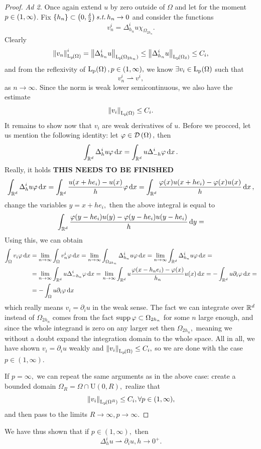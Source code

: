\documentclass{article}
\begin{document}
\begin{proof}
	\textit{Ad 2.}
	Once again extend $u$ by zero outside of $\Omega$ and let for the moment $p \in \qty(1,\infty)$. Fix $\qty{h_n} \subset \qty(0, \frac{\delta}{2}) \, \text{\textit{s.t.}} \, h_n \to 0$ and consider the functions
	\[
		v_n^i = \Delta_{h_n}^i u \chi_{\Omega_{2 h_n}}.
	\]
	Clearly
	\[
		\norm{v_n}^i_{\LpSet{\Omega}} = \norm{\Delta^i_{{h_n}} u}_{\LpSet{\Omega_{2 h_n}}} \leq \norm{\Delta^i_{{h_n}} u}_{\LpSet{\Omega_{\delta}}} \leq C_i,
	\]
	and from the reflexivity of $\LpSet{\Omega}, p \in \qty(1, \infty),$ we know $\exists v_i \in \LpSet{\Omega}$ such that
	\[
		v_n^i \rightharpoonup v^i,
	\]
	as $n \to \infty.$ Since the norm is weak lower semicontinuous, we also have the estimate
	\[
		\norm{v_i}_{\LpSet{\Omega}} \leq C_i.
	\]
	It remains to show now that $v_i$ are weak derivatives of $u$. Before we procced, let us mention the following identity: let $\varphi \in \mathcal{D}\!\,\left(\Omega \right),$ then
	\[
		\int_{{\mathbb R}^{d}}\Delta_h^i u \varphi\dd{x} = \int_{{\mathbb R}^{d}}u \Delta_{-h}^i \varphi\dd{x}.
	\]
	Really, it holds \textbf{THIS NEEDS TO BE FINISHED}
	\[
		\int_{{\mathbb R}^{d}}\Delta_h^i u \varphi\dd{x} = \int_{{\mathbb R}^{d}}\frac{u\qty(x+he_i) - u\qty(x)}{h}\varphi\dd{x} = \int_{{\mathbb R}^{d}}\frac{\varphi(x) u\qty(x+he_i) - \varphi(x) u(x)}{h}\dd{x},
	\]
	change the variables $y = x+ he_i,$ then the above integral is equal to
	\[
		\int_{{\mathbb R}^{d}}\frac{\varphi\qty(y - he_i)u(y) - \varphi(y - he_i) u\qty(y-he_i)}{h}\dd{y} =
	\]
	Using this, we can obtain 
	\begin{align*}
		\int_{\Omega}v_i \varphi\dd{x} &= \lim_{n \to \infty}\int_{\Omega}v_n^i \varphi \dd{x} = \lim_{n \to \infty}\int_{\Omega_{2h_n}}\Delta_{h_n}^i u \varphi\dd{x} = \lim_{n \to \infty} \int_{{\mathbb R}^{d}}\Delta_{h_n}^i u \varphi\dd{x} = \\
					       &= \lim_{n\to \infty}\int_{{\mathbb R}^{d}}u \Delta_{-h_n}^i \varphi \dd{x} = \lim_{n \to \infty}\int_{{\mathbb R}^{d}}u \frac{\varphi(x- h_n e_i) - \varphi(x)}{h_n}u(x)\dd{x} =  -\int_{{\mathbb R}^{d}}u \partial_{i}\varphi\dd{x} = \\
					       &=- \int_{\Omega}u \partial_{i} \varphi \dd{x}
	\end{align*}
which really means $v_i = \partial_{i} u$ in the weak sense. The fact we can integrate over ${\mathbb R}^{d}$ instead of $\Omega_{2h_n}$ comes from the fact $\operatorname{supp} \varphi \subset \Omega_{2h_n}$ for some $n$ large enough, and since the whole integrand is zero on any larger set then $\Omega_{2h_n},$ meaning we without a doubt expand the integration domain to the whole space. All in all, we have shown $v_i = \partial_{i} u$ weakly and $\norm{v_i}_{\LpSet{\Omega}} \leq C_i,$ so we are done with the case $p \in (1, \infty).$

If $p = \infty,$ we can repeat the same arguments as in the above case: create a bounded domain $\Omega_R = \Omega \cap \text{U}(0,R),$ realize that
\[
	\norm{v_i}_{\LpSet{\Omega^R}} \leq C_i, \forall p \in (1, \infty),
\]
and then pass to the limits $R \to \infty, p \to \infty.$

\end{proof}
\begin{remark}
    We have thus shown that if $p \in (1, \infty),$ then
    \[
	    \Delta_h^i u \rightharpoonup \partial_{i} u, h \to 0^+.
    \]
\end{remark}
\end{document}
